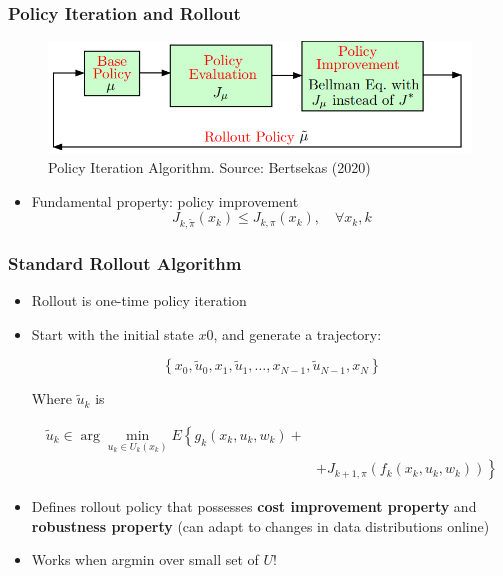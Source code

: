 \documentclass{beamer}
\begin{document}
    \begin{frame}
	\frametitle{Policy Iteration and Rollout}
	
    \begin{figure}
		\includegraphics[scale=0.65]{2a_pi}
		\caption{Policy Iteration Algorithm. Source: Bertsekas (2020)}
	\end{figure}
	
	
	\begin{itemize}
		\item Fundamental property: policy improvement
		$$J_{k, \tilde{\pi}}\left(x_{k}\right) \leq J_{k, \pi}\left(x_{k}\right), \quad \forall x_{k}, k$$
		
	\end{itemize}
	
	\end{frame}


\begin{frame}
	\frametitle{Standard Rollout Algorithm}
	
	\begin{itemize}
	\item Rollout is one-time policy iteration
	\item Start with the initial
	state $x0$, and generate a trajectory:
	
	$$
	\left\{x_{0}, \tilde{u}_{0}, x_{1}, \tilde{u}_{1}, \ldots, x_{N-1}, \tilde{u}_{N-1}, x_{N}\right\}
	$$
	
	Where  $\tilde{u}_{k}$ is 
		
	$$
	\begin{aligned}
	\tilde{u}_{k} \in \arg \min _{u_{k} \in U_{k}\left(x_{k}\right)} E\left\{g_{k}\left(x_{k}, u_{k}, w_{k}\right) + \right.\\
	&\left.+J_{k+1, \pi}\left(f_{k}\left(x_{k}, u_{k}, w_{k}\right)\right)\right\}
	\end{aligned}
	$$
	
	\item Defines rollout policy that 
	possesses \textbf{cost improvement property}
	and \textbf{robustness property} (can adapt to 
	changes in data distributions online)
	
	\item Works when argmin over small set of $U$!
	
	
\end{itemize}
	
	
\end{frame}
\end{document}
